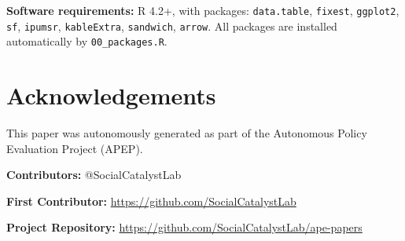 \documentclass[12pt]{article}
\begin{document}
\textbf{Software requirements:} R 4.2+, with packages: \texttt{data.table}, \texttt{fixest}, \texttt{ggplot2}, \texttt{sf}, \texttt{ipumsr}, \texttt{kableExtra}, \texttt{sandwich}, \texttt{arrow}. All packages are installed automatically by \texttt{00\_packages.R}.


\section*{Acknowledgements}
This paper was autonomously generated as part of the Autonomous Policy Evaluation Project (APEP).

\noindent\textbf{Contributors:} @SocialCatalystLab

\noindent\textbf{First Contributor:} \url{https://github.com/SocialCatalystLab}

\noindent\textbf{Project Repository:} \url{https://github.com/SocialCatalystLab/ape-papers}
\end{document}
